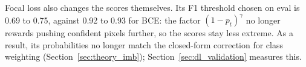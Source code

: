 Focal loss also changes the scores themselves. Its F1 threshold chosen on eval is 0.69 to 0.75, against
0.92 to 0.93 for BCE: the factor $(1-p_t)^{\gamma}$ no longer rewards pushing confident pixels further, so the
scores stay less extreme. As a result, its probabilities no longer match the closed-form correction for class
weighting (Section~\ref{sec:theory_imb}); Section~\ref{sec:dl_validation} measures this.

